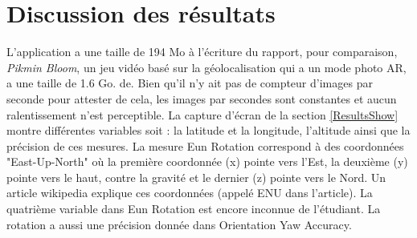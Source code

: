 \section{Discussion des résultats}
L'application a une taille de 194 Mo à l'écriture du rapport, pour comparaison, \textit{Pikmin Bloom}, un jeu vidéo basé sur la géolocalisation qui a un mode photo AR, a une taille de 1.6 Go.
de. Bien qu'il n'y ait pas de compteur d'images par seconde pour attester de cela, les images par secondes sont constantes et aucun ralentissement n'est perceptible.
La capture d'écran de la section \ref{ResultsShow} montre différentes variables soit : la latitude et la longitude, l'altitude ainsi que la précision de ces mesures.
La mesure Eun Rotation correspond à des coordonnées "East-Up-North" où la première coordonnée (x) pointe vers l'Est, la deuxième (y) pointe vers le haut, contre la gravité et le dernier (z) pointe vers le Nord. Un article wikipedia explique ces coordonnées (appelé ENU dans l'article)\cite{LocalTangentPlane2025}.
La quatrième variable dans Eun Rotation est encore inconnue de l'étudiant. La rotation a aussi une précision donnée dans Orientation Yaw Accuracy.


